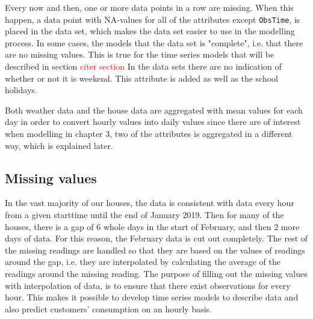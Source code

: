 \noindent Every now and then, one or more data points in a row are missing. When this happen, a data point with NA-values for all of the attributes except \texttt{ObsTime}, is placed in the data set, which makes the data set easier to use in the modelling process. In some cases, the models that the data set is "complete", i.e. that there are no missing values. This is true for the time series models that will be described in section \textcolor{red}{citer section} In the data sets there are no indication of whether or not it is weekend. This attribute is added as well as the school holidays.

\noindent Both weather data and the house data are aggregated with mean values for each day in order to convert hourly values into daily values since there are of interest when modelling in chapter 3, two of the attributes is aggregated in a different way, which is explained later.





\subsection{Missing values}
In the vast majority of our houses, the data is consistent with data every hour from a given starttime until the end of January 2019. Then for many of the houses, there is a gap of 6 whole days in the start of February, and then 2 more days of data. For this reason, the February data is cut out completely. The rest of the missing readings are handled so that they are based on the values of readings around the gap, i.e. they are interpolated by calculating the average of the readings around the missing reading. 
The purpose of filling out the missing values with interpolation of data, is to ensure that there exist observations for every hour. This makes it possible to develop time series models to describe data and also predict customers' consumption on an hourly basis. 

